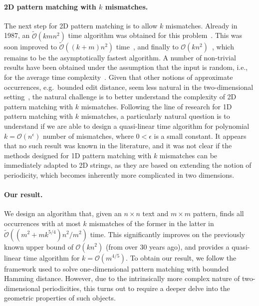 \documentclass[a4paper,11pt]{article}
\renewcommand{\O}{\mathcal{O}}
\newcommand{\tO}{\tilde{\mathcal{O}}}
\begin{document}
\paragraph{2D pattern matching with \boldmath$k$\unboldmath{} mismatches.} The next step for 2D pattern matching is to allow $k$ mismatches.
Already in 1987, an $\tO(kmn^{2})$ time algorithm was obtained for this problem~\cite{Krithivasan1987}. This was
soon improved to $\tO((k+m)n^2)$ time~\cite{Ranka1991}, and finally to $\O(kn^2)$~\cite{Amir1991}, which remains
to be the asymptotically fastest algorithm. A number of non-trivial results have been obtained under the assumption
that the input is random, i.e., for the average time complexity~\cite{Baeza-Yates1998,Park1998,Kaerkkaeinen1999}.
Given that other notions of approximate occurrences, e.g.~bounded edit distance, seem less natural in the two-dimensional
setting~\cite{Baeza-Yates1998a}, the natural challenge is to better understand the complexity
of 2D pattern matching with $k$ mismatches. Following the line of research for 1D pattern matching with $k$
mismatches, a particularly natural question is to understand if we are able to design a quasi-linear time
algorithm for polynomial $k=\O(n^{\epsilon})$ number of mismatches, where $0 < \epsilon$ is a small constant. It appears that no such result was known
in the literature, and it was not clear if the methods designed for 1D pattern matching with $k$ mismatches
can be immediately adapted to 2D strings, as they are based on extending the notion of periodicity, which becomes
inherently more complicated in two dimensions.

\paragraph{Our result.} We design an algorithm that, given an $n\times n$ text and $m\times m$ pattern, finds
all occurrences with at most $k$ mismatches of the former in the latter in $\tO((m^2 + mk^{5/4})n^2 / m^2)$ time.
This significantly improves on the previously known upper bound of $\O(kn^{2})$ (from over 30 years ago),
and provides a quasi-linear time algorithm for $k=\O(m^{4/5})$. To obtain our result, we follow the framework
used to solve one-dimensional pattern matching with bounded Hamming distance. However, due to the intrinsically
more complex nature of two-dimensional periodicities, this turns out to require a deeper delve into the geometric
properties of such objects.
\end{document}
